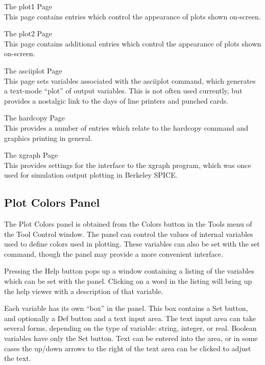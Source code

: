 \begin{description}
\item{The {\cb plot1} Page}\\
This page contains entries which control the appearance of plots shown
on-screen.

\item{The {\cb plot2} Page}\\
This page contains additional entries which control the appearance of
plots shown on-screen.

\item{The {\cb asciiplot} Page}\\
This page sets variables associated with the {\cb asciiplot} command,
which generates a text-mode ``plot'' of output variables.  This is not
often used currently, but provides a nostalgic link to the days of
line printers and punched cards.

\item{The {\cb hardcopy} Page}\\
This provides a number of entries which relate to the {\cb hardcopy}
command and graphics printing in general.

\item{The {\cb xgraph} Page}\\
This provides settings for the interface to the {\et xgraph} program,
which was once used for simulation output plotting in Berkeley SPICE.
\end{description}

\subsection{Plot Colors Panel}
\label{colors}

The {\cb Plot Colors} panel is obtained from the {\cb Colors} button
in the {\cb Tools} menu of the {\cb Tool Control} window.  The panel
can control the values of internal variables used to define colors
used in plotting.  These variables can also be set with the {\cb set}
command, though the panel may provide a more convenient interface.

Pressing the {\cb Help} button pops up a window containing a listing
of the variables which can be set with the panel.  Clicking on a word
in the listing will bring up the help viewer with a description of
that variable.

Each variable has its own ``box'' in the panel.  This box contains a
{\cb Set} button, and optionally a {\cb Def} button and a text input
area.  The text input area can take several forms, depending on the
type of variable:  string, integer, or real.  Boolean variables have
only the {\cb Set} button.  Text can be entered into the area, or in
some cases the up/down arrows to the right of the text area can be
clicked to adjust the text.

